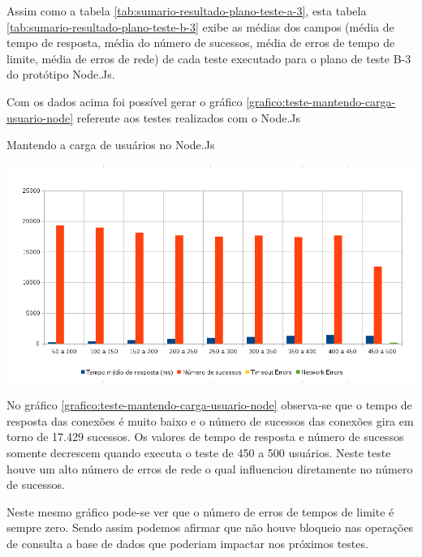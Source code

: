   Assim como a tabela \ref{tab:sumario-resultado-plano-teste-a-3}, esta tabela \ref{tab:sumario-resultado-plano-teste-b-3} exibe as médias 
  dos campos (média de tempo de resposta, média do número de sucessos, média de erros de tempo de limite, média de erros de rede) 
  de cada teste executado para o plano de teste B-3 do protótipo Node.Js.
  
  Com os dados acima foi possível gerar o gráfico \ref{grafico:teste-mantendo-carga-usuario-node} referente aos testes 
  realizados com o Node.Js

  \begin{grafico}[H]
    \setlength{\abovecaptionskip}{5pt}
    \setlength{\belowcaptionskip}{0pt}
    \label{grafico:teste-mantendo-carga-usuario-node}
    \caption[Mantendo a carga de usuários no Node.Js]
	    {Mantendo a carga de usuários no Node.Js}
    \centering
    \includegraphics[width=.80\textwidth]{imagem/graficos/grafico_node_plano_de_teste_3.png}
    \captionsetup[grafico]{justification=centering}
  \end{grafico}

  No gráfico \ref{grafico:teste-mantendo-carga-usuario-node}  observa-se que o tempo de resposta das conexões 
  é muito baixo e o número de sucessos das conexões gira em torno de 17.429 sucessos. Os valores de tempo de resposta e
  número de sucessos somente decrescem quando executa o teste de 450 a 500 usuários. Neste teste houve um alto número de erros 
  de rede o qual influenciou diretamente no número de sucessos.
  
  Neste mesmo gráfico pode-se ver que o número de erros de tempos de limite é sempre zero. Sendo assim podemos afirmar
  que não houve bloqueio nas operações de consulta a base de dados que poderiam impactar nos próximos testes.
  
